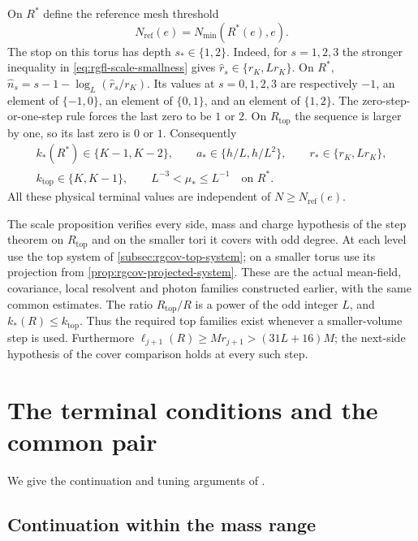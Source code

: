 On $R^*$ define the reference mesh threshold
\begin{equation}\label{eq:rgfl-reference-threshold}
                    N_{\mathrm{ref}}(e)=N_{\min}(R^*(e),e).
\end{equation}
The stop on this torus has depth $s_*\in\{1,2\}$.
Indeed, for $s=1,2,3$ the stronger inequality in
\eqref{eq:rgfl-scale-smallness} gives
$\widehat r_s\in\{r_K,Lr_K\}$.
On $R^*$,
$\widehat n_s=s-1-\log_L(\widehat r_s/r_K)$.
Its values at $s=0,1,2,3$ are respectively
$-1$, an element of $\{-1,0\}$, an element of
$\{0,1\}$, and an element of $\{1,2\}$.
The zero-step-or-one-step rule forces the last zero
to be $1$ or $2$. On $R_{\mathrm{top}}$ the sequence
is larger by one, so its last zero is $0$ or $1$.
Consequently
\begin{equation}\label{eq:rgfl-reference-stop}
 \begin{gathered}
 k_*(R^*)\in\{K-1,K-2\},\qquad
 a_*\in\{h/L,h/L^2\},\qquad r_*\in\{r_K,Lr_K\},\\
 k_{\mathrm{top}}\in\{K,K-1\},\qquad
 L^{-3}<\mu_*\le L^{-1}\quad\text{on }R^* .
 \end{gathered}
\end{equation}
All these physical terminal values are independent
of $N\ge N_{\mathrm{ref}}(e)$.

The scale proposition verifies every side, mass
and charge hypothesis of the step theorem
on $R_{\mathrm{top}}$ and on the smaller tori it covers with odd degree.
At each level use the top system of
\cref{subsec:rgcov-top-system}; on a smaller
torus use its projection from
\cref{prop:rgcov-projected-system}.
These are the actual mean-field, covariance,
local resolvent and photon families constructed
earlier, with the same common estimates.
The ratio $R_{\mathrm{top}}/R$ is a power of the
odd integer $L$, and $k_*(R)\le k_{\mathrm{top}}$.
Thus the required top families exist whenever
a smaller-volume step is used.
Furthermore
$\ell_{j+1}(R)\ge Mr_{j+1}>(31L+16)M$;
the next-side hypothesis of the cover comparison
holds at every such step.

\section{The terminal conditions and the common pair}\label{sec:common-tuning}

We give the continuation and tuning arguments of
\cite[\S\S16.2--16.4]{QED3Master}.

\subsection{Continuation within the mass range}
\label{subsec:rgfl-continuation}

